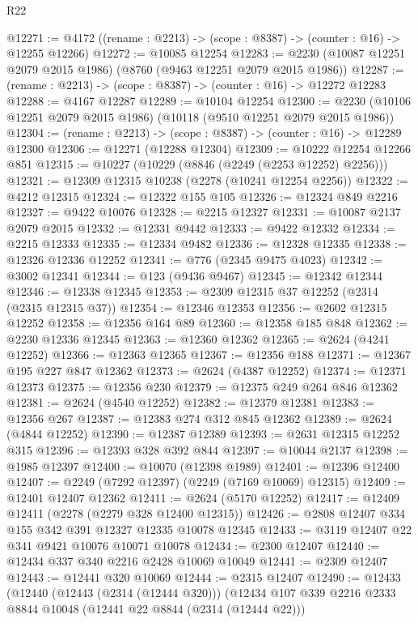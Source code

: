 \begin{lexlean}{R22}
\begin{coremodule}
@12271 := @4172 ((rename : @2213) -> (scope : @8387) -> (counter : @16) -> @12255 @12266)
@12272 := @10085 @12254
@12283 := @2230 (@10087 @12251 @2079 @2015 @1986) (@8760 (@9463 @12251 @2079 @2015 @1986))
@12287 := (rename : @2213) -> (scope : @8387) -> (counter : @16) -> @12272 @12283
@12288 := @4167 @12287
@12289 := @10104 @12254
@12300 := @2230 (@10106 @12251 @2079 @2015 @1986) (@10118 (@9510 @12251 @2079 @2015 @1986))
@12304 := (rename : @2213) -> (scope : @8387) -> (counter : @16) -> @12289 @12300
@12306 := @12271 (@12288 @12304)
@12309 := @10222 @12254 @12266 @851
@12315 := @10227 (@10229 (@8846 (@2249 (@2253 @12252) @2256)))
@12321 := @12309 @12315 @10238 (@2278 (@10241 @12254 @2256))
@12322 := @4212 @12315
@12324 := @12322 @155 @105
@12326 := @12324 @849 @2216
@12327 := @9422 @10076
@12328 := @2215 @12327
@12331 := @10087 @2137 @2079 @2015
@12332 := @12331 @9442
@12333 := @9422 @12332
@12334 := @2215 @12333
@12335 := @12334 @9482
@12336 := @12328 @12335
@12338 := @12326 @12336 @12252
@12341 := @776 (@2345 @9475 @4023)
@12342 := @3002 @12341
@12344 := @123 (@9436 @9467)
@12345 := @12342 @12344
@12346 := @12338 @12345
@12353 := @2309 @12315 @37 @12252 (@2314 (@2315 @12315 @37))
@12354 := @12346 @12353
@12356 := @2602 @12315 @12252
@12358 := @12356 @164 @89
@12360 := @12358 @185 @848
@12362 := @2230 @12336 @12345
@12363 := @12360 @12362
@12365 := @2624 (@4241 @12252)
@12366 := @12363 @12365
@12367 := @12356 @188
@12371 := @12367 @195 @227 @847 @12362
@12373 := @2624 (@4387 @12252)
@12374 := @12371 @12373
@12375 := @12356 @230
@12379 := @12375 @249 @264 @846 @12362
@12381 := @2624 (@4540 @12252)
@12382 := @12379 @12381
@12383 := @12356 @267
@12387 := @12383 @274 @312 @845 @12362
@12389 := @2624 (@4844 @12252)
@12390 := @12387 @12389
@12393 := @2631 @12315 @12252 @315
@12396 := @12393 @328 @392 @844
@12397 := @10044 @2137
@12398 := @1985 @12397
@12400 := @10070 (@12398 @1989)
@12401 := @12396 @12400
@12407 := @2249 (@7292 @12397) (@2249 (@7169 @10069) @12315)
@12409 := @12401 @12407 @12362
@12411 := @2624 (@5170 @12252)
@12417 := @12409 @12411 (@2278 (@2279 @328 @12400 @12315))
@12426 := @2808 @12407 @334 @155 @342 @391 @12327 @12335 @10078 @12345
@12433 := @3119 @12407 @22 @341 @9421 @10076 @10071 @10078
@12434 := @2300 @12407
@12440 := @12434 @337 @340 @2216 @2428 @10069 @10049
@12441 := @2309 @12407
@12443 := @12441 @320 @10069
@12444 := @2315 @12407
@12490 := @12433
    (@12440
      (@12443 (@2314 (@12444 @320)))
      (@12434
        @107
        @339
        @2216
        @2333
        @8844
        @10048
        (@12441 @22 @8844 (@2314 (@12444 @22)))

\end{coremodule}
\end{lexlean}

